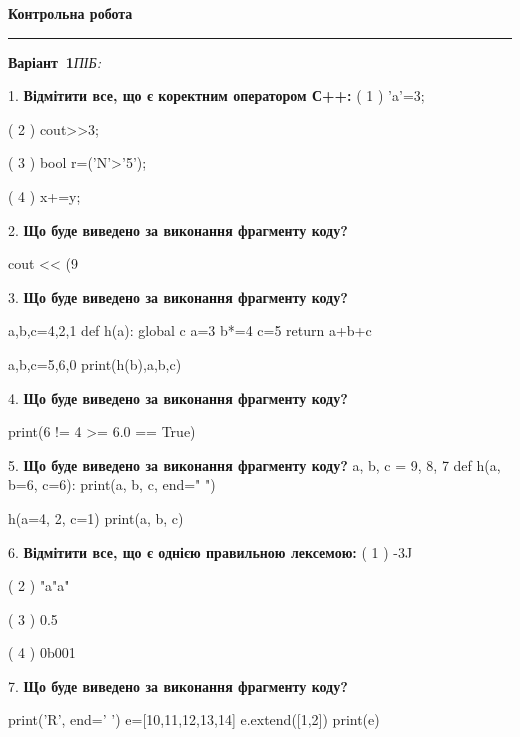 \documentclass[11pt]{article}
\begin{document}
{\centering\Large\bfseries Контрольна робота\par}
\medskip
\noindent\rule{\linewidth}{0.5pt}
\smallskip
\noindent\textbf{Варіант \No\,1}\hfill \textit{ПІБ:}\,\underline{\hspace{60mm}}
\vspace{4mm}

1. %
\textbf{Відмітити все, що є коректним оператором С++:}
( 1 ) 'a'=3;

( 2 ) cout>>3;

( 3 ) bool r=('N'>'5');

( 4 ) x+=y;
\vspace{5mm}

2. \textbf{Що буде виведено за виконання фрагменту коду?}

cout << (9 %
\vspace{5mm}

3. \textbf{Що буде виведено за виконання фрагменту коду?}

a,b,c=4,2,1
def h(a):
global c    a=3
    b*=4
    c=5
    return a+b+c

a,b,c=5,6,0
print(h(b),a,b,c)
\vspace{5mm}

4. \textbf{Що буде виведено за виконання фрагменту коду?}

print(6 != 4 >= 6.0 == True)
\vspace{5mm}

5. \textbf{Що буде виведено за виконання фрагменту коду?}
a, b, c = 9, 8, 7
def h(a, b=6, c=6):
    print(a, b, c, end=" ")

h(a=4, 2, c=1)
print(a, b, c)
\vspace{5mm}

6. %
\textbf{Відмітити все, що є однією правильною лексемою:}
( 1 ) -3J

( 2 ) "a"a"

( 3 ) 0.5

( 4 ) 0b001
\vspace{5mm}

7. \textbf{Що буде виведено за виконання фрагменту коду?}

print('R', end=' ')
e=[10,11,12,13,14]
e.extend([1,2])
print(e)

\vspace{5mm}
\end{document}
